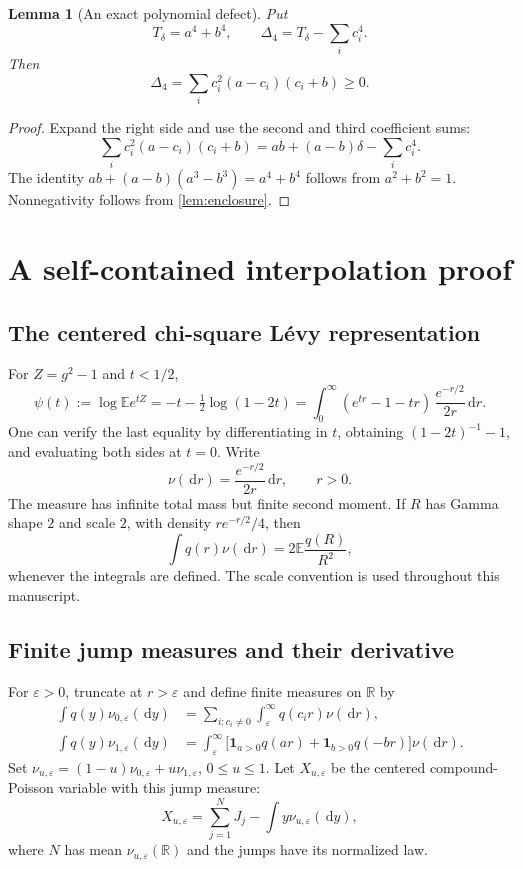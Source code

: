 \documentclass[11pt]{article}
\numberwithin{equation}{section}
\newtheorem{lemma}[theorem]{Lemma}
\theoremstyle{definition}
\theoremstyle{remark}
\newcommand{\E}{\mathbb E}
\newcommand{\R}{\mathbb R}
\newcommand{\ind}{\mathbf 1}
\newcommand{\dd}{\,\mathrm d}
\newcommand{\gapfour}{\Delta_4}
\begin{document}
\begin{lemma}[An exact polynomial defect]\label{lem:defect}
Put
\begin{equation}\label{eq:defect}
T_\delta=a^4+b^4,\qquad
\gapfour=T_\delta-\sum_i c_i^4.
\end{equation}
Then
\begin{equation}\label{eq:defect-factor}
\gapfour=\sum_i c_i^2(a-c_i)(c_i+b)\geq0.
\end{equation}
\end{lemma}
\begin{proof}
Expand the right side and use the second and third coefficient sums:
\[
\sum_i c_i^2(a-c_i)(c_i+b)
=ab+(a-b)\delta-\sum_i c_i^4.
\]
The identity $ab+(a-b)(a^3-b^3)=a^4+b^4$ follows from $a^2+b^2=1$. Nonnegativity follows from \cref{lem:enclosure}.
\end{proof}

\section{A self-contained interpolation proof}
\label{sec:proof}

\subsection{The centered chi-square L\'evy representation}
For $Z=g^2-1$ and $t<1/2$,
\begin{equation}\label{eq:psi}
\psi(t):=\log\E e^{tZ}=-t-\tfrac12\log(1-2t)
=\int_0^\infty(e^{tr}-1-tr)\,\frac{e^{-r/2}}{2r}\dd r.
\end{equation}
One can verify the last equality by differentiating in $t$, obtaining $(1-2t)^{-1}-1$, and evaluating both sides at $t=0$.
Write
\[
\nu(\dd r)=\frac{e^{-r/2}}{2r}\dd r,\qquad r>0.
\]
The measure has infinite total mass but finite second moment. If $R$ has Gamma shape $2$ and scale $2$, with density $r e^{-r/2}/4$, then
\begin{equation}\label{eq:R-representation}
\int q(r)\nu(\dd r)=2\E\frac{q(R)}{R^2},
\end{equation}
whenever the integrals are defined. The scale convention is used throughout this manuscript.

\subsection{Finite jump measures and their derivative}
For $\varepsilon>0$, truncate at $r>\varepsilon$ and define finite measures on $\R$ by
\begin{align}
\int q(y)\nu_{0,\varepsilon}(\dd y)
&=\sum_{i:c_i\ne0}\int_\varepsilon^\infty q(c_ir)\nu(\dd r),\label{eq:nu0}\\
\int q(y)\nu_{1,\varepsilon}(\dd y)
&=\int_\varepsilon^\infty
\bigl[\ind_{a>0}q(ar)+\ind_{b>0}q(-br)\bigr]\nu(\dd r).\label{eq:nu1}
\end{align}
Set $\nu_{u,\varepsilon}=(1-u)\nu_{0,\varepsilon}+u\nu_{1,\varepsilon}$, $0\leq u\leq1$. Let $X_{u,\varepsilon}$ be the centered compound-Poisson variable with this jump measure:
\[
X_{u,\varepsilon}=\sum_{j=1}^{N}J_j-\int y\nu_{u,\varepsilon}(\dd y),
\]
where $N$ has mean $\nu_{u,\varepsilon}(\R)$ and the jumps have its normalized law.
\end{document}
